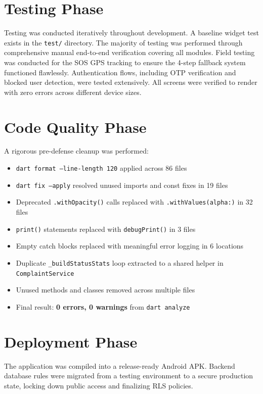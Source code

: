 \documentclass[11pt, a4paper]{report}
\begin{document}
\section{Testing Phase}
Testing was conducted iteratively throughout development. A baseline widget test exists in the \texttt{test/} directory. The majority of testing was performed through comprehensive manual end-to-end verification covering all modules. Field testing was conducted for the SOS GPS tracking to ensure the 4-step fallback system functioned flawlessly. Authentication flows, including OTP verification and blocked user detection, were tested extensively. All screens were verified to render with zero errors across different device sizes.

\section{Code Quality Phase}
A rigorous pre-defense cleanup was performed:
\begin{itemize}
    \item \texttt{dart format --line-length 120} applied across 86 files
    \item \texttt{dart fix --apply} resolved unused imports and const fixes in 19 files
    \item Deprecated \texttt{.withOpacity()} calls replaced with \texttt{.withValues(alpha:)} in 32 files
    \item \texttt{print()} statements replaced with \texttt{debugPrint()} in 3 files
    \item Empty catch blocks replaced with meaningful error logging in 6 locations
    \item Duplicate \texttt{\_buildStatusStats} loop extracted to a shared helper in \texttt{ComplaintService}
    \item Unused methods and classes removed across multiple files
    \item Final result: \textbf{0 errors, 0 warnings} from \texttt{dart analyze}
\end{itemize}

\section{Deployment Phase}
The application was compiled into a release-ready Android APK. Backend database rules were migrated from a testing environment to a secure production state, locking down public access and finalizing RLS policies.

\end{document}
